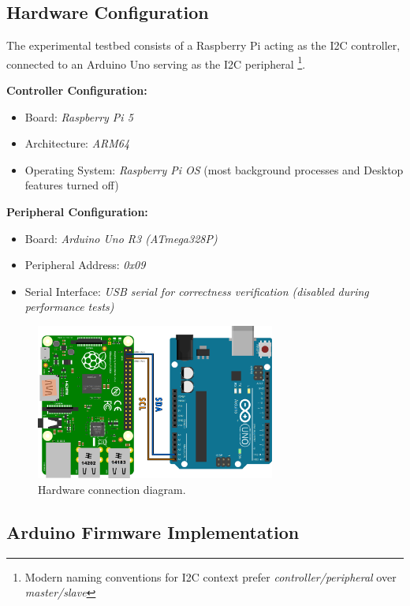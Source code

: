 \subsection{Hardware Configuration}
\label{subsec:eval-setup-hw}

The experimental testbed consists of a Raspberry Pi acting as the I2C controller, connected to an Arduino Uno serving as the I2C peripheral \footnote{Modern naming conventions for I2C context prefer \textit{controller/peripheral} over \textit{master/slave}}.

\textbf{Controller Configuration:}
\begin{itemize}
    \item Board: \textit{Raspberry Pi 5}
    \item Architecture: \textit{ARM64} %
    \item Operating System: \textit{Raspberry Pi OS} (most background processes and Desktop features turned off)
\end{itemize}

\textbf{Peripheral Configuration:}
\begin{itemize}
    \item Board: \textit{Arduino Uno R3 (ATmega328P)}
    \item Peripheral Address: \textit{0x09}
    \item Serial Interface: \textit{USB serial for correctness verification (disabled during performance tests)}
\end{itemize}

\begin{figure}[h]
	\centering
	\includegraphics[width=0.7\textwidth]{images/HW_config.png}
	\caption{Hardware connection diagram.}
	\label{fig:hw-connection}
\end{figure}

\subsection{Arduino Firmware Implementation}
\label{subsec:eval-setup-fw}

